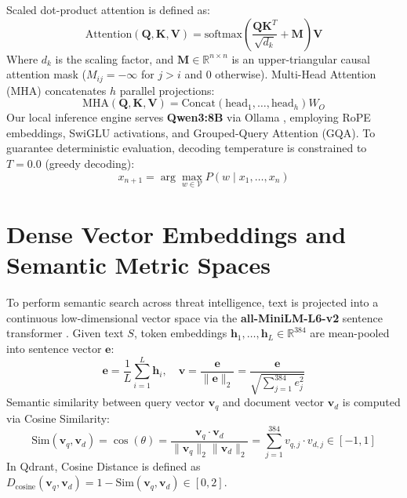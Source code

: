 Scaled dot-product attention is defined as:
\begin{equation}
\label{eq:scaled_attention}
\text{Attention}(\mathbf{Q}, \mathbf{K}, \mathbf{V}) = \text{softmax}\left( \frac{\mathbf{Q} \mathbf{K}^T}{\sqrt{d_k}} + \mathbf{M} \right) \mathbf{V}
\end{equation}
Where $d_k$ is the scaling factor, and $\mathbf{M} \in \mathbb{R}^{n \times n}$ is an upper-triangular causal attention mask ($M_{ij} = -\infty$ for $j > i$ and $0$ otherwise). Multi-Head Attention (MHA) concatenates $h$ parallel projections:
\begin{equation}
\label{eq:mha}
\text{MHA}(\mathbf{Q}, \mathbf{K}, \mathbf{V}) = \text{Concat}(\text{head}_1, \dots, \text{head}_h) W_O
\end{equation}
Our local inference engine serves \textbf{Qwen3:8B} via Ollama \cite{qwen2024technical}, employing RoPE embeddings, SwiGLU activations, and Grouped-Query Attention (GQA). To guarantee deterministic evaluation, decoding temperature is constrained to $T = 0.0$ (greedy decoding):
\begin{equation}
\label{eq:greedy_decoding}
x_{n+1} = \arg\max_{w \in \mathcal{V}} P(w \mid x_1, \dots, x_n)
\end{equation}

\section{Dense Vector Embeddings and Semantic Metric Spaces}
\label{sec:theory_embeddings}
To perform semantic search across threat intelligence, text is projected into a continuous low-dimensional vector space via the \textbf{all-MiniLM-L6-v2} sentence transformer \cite{reimers2019sentencebert}. Given text $S$, token embeddings $\mathbf{h}_1, \dots, \mathbf{h}_L \in \mathbb{R}^{384}$ are mean-pooled into sentence vector $\mathbf{e}$:
\begin{equation}
\label{eq:mean_pooling}
\mathbf{e} = \frac{1}{L} \sum_{i=1}^L \mathbf{h}_i, \quad \mathbf{v} = \frac{\mathbf{e}}{\|\mathbf{e}\|_2} = \frac{\mathbf{e}}{\sqrt{\sum_{j=1}^{384} e_j^2}}
\end{equation}
Semantic similarity between query vector $\mathbf{v}_q$ and document vector $\mathbf{v}_d$ is computed via Cosine Similarity:
\begin{equation}
\label{eq:cosine_sim}
\text{Sim}(\mathbf{v}_q, \mathbf{v}_d) = \cos(\theta) = \frac{\mathbf{v}_q \cdot \mathbf{v}_d}{\|\mathbf{v}_q\|_2 \|\mathbf{v}_d\|_2} = \sum_{j=1}^{384} v_{q,j} \cdot v_{d,j} \in [-1, 1]
\end{equation}
In Qdrant, Cosine Distance is defined as $D_{\text{cosine}}(\mathbf{v}_q, \mathbf{v}_d) = 1 - \text{Sim}(\mathbf{v}_q, \mathbf{v}_d) \in [0, 2]$.

